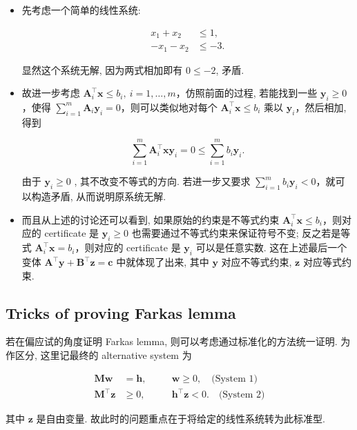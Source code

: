 \documentclass[11pt,UTF8,scheme=plain,fontset=fandol,linespread=1.3]{ctexart}
\numberwithin{figure}{section}
\begin{document}
\begin{itemize}
\item {}先考虑一个简单的线性系统:

\[
\begin{aligned}
  x_1 + x_2 &\leq 1,\\
  -x_1 - x_2 &\leq -3.
\end{aligned}
\]

显然这个系统无解, 因为两式相加即有 $0 \leq -2$, 矛盾.


\item {}故进一步考虑 $\bm{A}_i^\top \bm{x} \leq b_i,~ i=1,\dots,m$，仿照前面的过程, 若能找到一些 $\bm{y}_i \geq 0$，使得 $\sum_{i=1}^m \bm{A}_i \bm{y}_i = 0$，则可以类似地对每个 $\bm{A}_i^\top \bm{x} \leq b_i$ 乘以 $\bm{y}_i$，然后相加, 得到

\[
\sum_{i=1}^m \bm{A}_i^\top \bm{x} \bm{y}_i = 0 \leq \sum_{i=1}^m b_i \bm{y}_i.
\]

由于 $\bm{y}_i \geq 0$ , 其不改变不等式的方向. 若进一步又要求 $\sum_{i=1}^m b_i \bm{y}_i < 0$，就可以构造矛盾, 从而说明原系统无解.


\item {}而且从上述的讨论还可以看到, 如果原始的约束是不等式约束 $\bm{A}_i^\top \bm{x} \leq b_i$，则对应的 certificate 是 $\bm{y}_i \geq 0$ 也需要通过不等式约束来保证符号不变; 反之若是等式 $\bm{A}_i^\top \bm{x} = b_i$，则对应的 certificate 是 $\bm{y}_i$ 可以是任意实数. 这在上述最后一个变体 $\bm{A}^\top \bm{y} + \bm{B}^\top \bm{z} = \bm{c}$ 中就体现了出来, 其中 $\bm{y}$ 对应不等式约束, $\bm{z}$ 对应等式约束.


\end{itemize}

\subsection{Tricks of proving Farkas lemma}

若在偏应试的角度证明 Farkas lemma, 则可以考虑通过标准化的方法统一证明. 为作区分, 这里记最终的 alternative system 为

\[
\begin{aligned}
  \bm{M}\bm{w} & = \bm{h},\quad &&\bm{w} \geq 0,\quad \text{(System 1)}\\
  \bm{M}^\top \bm{z} &\geq 0,\quad &&\bm{h}^\top \bm{z} < 0. \quad \text{(System 2)}
\end{aligned}
\]

其中 $\bm{z}$ 是自由变量. 故此时的问题重点在于将给定的线性系统转为此标准型.
\end{document}
